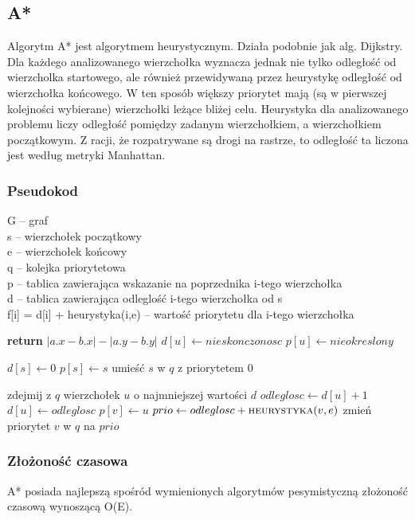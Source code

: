 \documentclass[11pt,a4paper]{article}
\begin{document}
\subsection{A*}
Algorytm A* jest algorytmem heurystycznym. Działa podobnie jak alg. Dijkstry. Dla każdego
analizowanego wierzchołka wyznacza jednak nie tylko odległość od wierzcholka startowego, ale również
przewidywaną przez heurystykę odległość od wierzchołka końcowego. W ten sposób większy priorytet mają
(są w pierwszej kolejności wybierane) wierzchołki leżące bliżej celu.
Heurystyka dla analizowanego problemu liczy odległość pomiędzy zadanym wierzchołkiem, 
a wierzchołkiem początkowym. Z racji, że rozpatrywane są drogi na rastrze, to odległość ta 
liczona jest według metryki Manhattan.
\subsubsection{Pseudokod}
G – graf\\
s – wierzchołek początkowy\\
e – wierzchołek końcowy\\
q – kolejka priorytetowa\\
p – tablica zawierająca wskazanie na poprzednika i-tego wierzchołka\\
d – tablica zawierająca odleglość i-tego wierzchołka od s\\
f[i] = d[i] + heurystyka(i,e) – wartość priorytetu dla i-tego wierzchołka\\
\begin{algorithmic}
	\State \textbf{return} \(\lvert{a.x-b.x}\rvert-\lvert{a.y-b.y}\rvert\)
\EndFunction
\Statex
{}
   	\State $d[u]\gets nieskonczonosc$
   	\State $p[u]\gets nieokreslony$
   \EndFor
   
   \State $d[s]\gets 0$
   \State $p[s]\gets s$
   \State umieść $s$ w $q$ z priorytetem 0
   
   	\State zdejmij z $q$ wierzchołek $u$ o najmniejszej wartości $d$
   	 \Return
   	\EndIf
   		\State $odleglosc\gets d[u]+1$
   			\State $d[u]\gets odleglosc$
   			\State $p[v]\gets u$
   			\State $prio\gets odleglosc + \Call{heurystyka}{v,e}$
   			\State zmień priorytet $v$ w $q$ na $prio$
   		\EndIf
   \EndFor
   \EndWhile
\EndFunction
\end{algorithmic}
\subsubsection{Złożoność czasowa}
A* posiada najlepszą spośród wymienionych algorytmów pesymistyczną złożoność czasową wynoszącą O(E).
\end{document}
